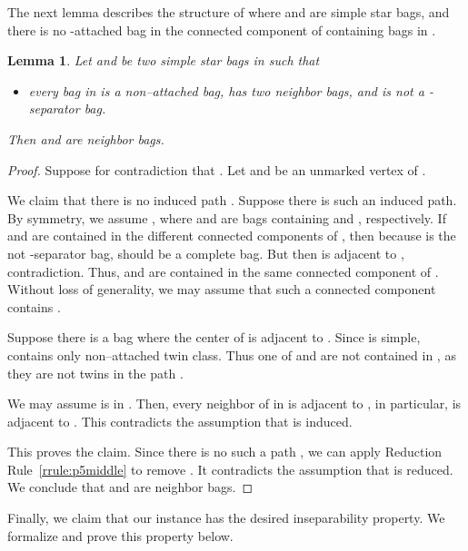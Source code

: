 \documentclass[11pt]{elsarticle}
\newtheorem{lemma}[theorem]{Lemma}
\begin{document}
The next lemma describes the structure of  where  and  are simple star bags, and there is no -attached bag in the connected component of  containing bags in .

\begin{lemma}\label{rrule:bypassing1}
Let  and  be two simple star bags in  such that 
\begin{itemize}
\item every bag in  is a non--attached bag, has two neighbor bags, and is not a -separator bag. 
\end{itemize}
Then  and  are neighbor bags.
\end{lemma}
\begin{proof}
Suppose for contradiction that .
Let  and  be an unmarked vertex of .

We claim that there is no induced path .
Suppose there is such an induced path.
By symmetry, we assume , where  and  are bags containing  and , respectively.
If  and  are contained in the different connected components of , 
then because  is the not -separator bag,  should be a complete bag.
But then  is adjacent to , contradiction.
Thus,  and  are contained in the same connected component of .
Without loss of generality, we may assume that such a connected component contains .

Suppose there is a bag  where the center of  is adjacent to .
Since  is simple,  contains only non--attached twin class.
Thus one of  and  are not contained in , as they are not twins in the path .

We may assume  is in .
Then, every neighbor of  in  is adjacent to , in particular,  is adjacent to . 
This contradicts the assumption that  is induced.

This proves the claim. Since there is no such a path , we can apply Reduction Rule~\ref{rrule:p5middle} to remove .
It contradicts the assumption that  is reduced.
We conclude that  and  are neighbor bags.
\end{proof}



Finally, we claim that our instance has the desired inseparability property. We formalize and prove this property below.
\end{document}

